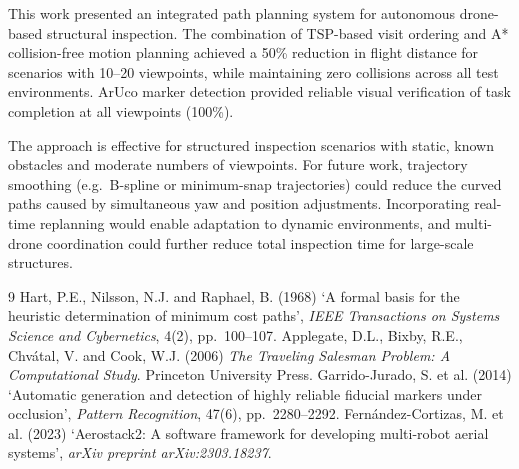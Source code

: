 \documentclass[11pt,a4paper]{article}
\begin{document}
This work presented an integrated path planning system for autonomous drone-based structural inspection. The combination of TSP-based visit ordering and A* collision-free motion planning achieved a 50\% reduction in flight distance for scenarios with 10--20 viewpoints, while maintaining zero collisions across all test environments. ArUco marker detection provided reliable visual verification of task completion at all viewpoints (100\%).

The approach is effective for structured inspection scenarios with static, known obstacles and moderate numbers of viewpoints. For future work, trajectory smoothing (e.g.\ B-spline or minimum-snap trajectories) could reduce the curved paths caused by simultaneous yaw and position adjustments. Incorporating real-time replanning would enable adaptation to dynamic environments, and multi-drone coordination could further reduce total inspection time for large-scale structures.

\begin{thebibliography}{9}
 Hart, P.E., Nilsson, N.J. and Raphael, B. (1968) `A formal basis for the heuristic determination of minimum cost paths', \textit{IEEE Transactions on Systems Science and Cybernetics}, 4(2), pp.~100--107.
 Applegate, D.L., Bixby, R.E., Chv\'{a}tal, V. and Cook, W.J. (2006) \textit{The Traveling Salesman Problem: A Computational Study}. Princeton University Press.
 Garrido-Jurado, S. et al. (2014) `Automatic generation and detection of highly reliable fiducial markers under occlusion', \textit{Pattern Recognition}, 47(6), pp.~2280--2292.
 Fern\'{a}ndez-Cortizas, M. et al. (2023) `Aerostack2: A software framework for developing multi-robot aerial systems', \textit{arXiv preprint arXiv:2303.18237}.
\end{thebibliography}
\end{document}
